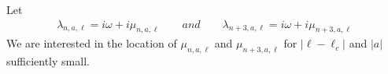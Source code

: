 \documentclass[12pt]{amsart}    %
\numberwithin{equation}{section}
\begin{document}
Let
\begin{align}
    \lambda_{n,a,\ell} = i \omega + i \mu_{n,a,\ell}
    \quad \quad and \quad\quad
    \lambda_{n+3,a,\ell} = i \omega + i \mu_{n+3,a,\ell}
\end{align}
We are interested in the location of $\mu_{n,a,\ell}$ and $\mu_{n+3,a,\ell}$ for $|\ell-\ell_c|$ and $|a|$ sufficiently small. %
\end{document}

